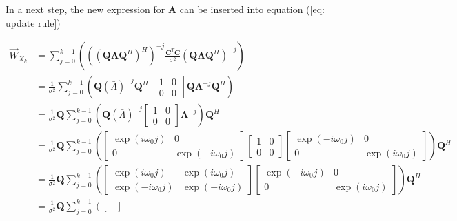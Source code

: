 \documentclass[11pt,a4paper,twoside]{report}
\newcommand{\messF}[3]{\overrightarrow{#1}_{{#2}_{k{#3}}}}
\newcommand{\mat}[1]{\mathbf{#1}}
\begin{document}
In a next step, the new expression for $\mat{A}$ can be inserted into equation (\ref{eq: update rule}) \cite{ST:Malmberg}

\begin{align}
	\nonumber
	\messF{W}{X}{} &= \sum_{j=0}^{k-1}\left(\left(\left(\mat{Q\Lambda}\mat{Q}^H\right)^H\right)^{-j}\frac{\mat{C}^T\mat{C}}{\sigma^2}\left(\mat{Q\Lambda}\mat{Q}^H\right)^{-j}\right) \\
	\label{eq: update rule, unitary Q}
	&= \frac{1}{\sigma^2}\sum_{j=0}^{k-1}\left(\mat{Q}\left(\bar{\Lambda}\right)^{-j}\mat{Q}^H
		\begin{bmatrix}
			1 & 0 \\
			0 & 0
		\end{bmatrix}
		\mat{Q}\mat{\Lambda}^{-j}\mat{Q}^H\right)
	\\
	\nonumber
	&= \frac{1}{\sigma^2}\mat{Q}\sum_{j=0}^{k-1}\left(\mat{Q}\left(\bar{\Lambda}\right)^{-j}
		\begin{bmatrix}
			1 & 0 \\
			0 & 0
		\end{bmatrix}
		\mat{\Lambda}^{-j}\right)\mat{Q}^H
	\\
	\nonumber
	&= \frac{1}{\sigma^2}\mat{Q}\sum_{j=0}^{k-1}\left(
		\begin{bmatrix}
			\exp{(i\omega_0j)} & 0 \\
			0 & \exp{(-i\omega_0j)}
		\end{bmatrix}
		\begin{bmatrix}
			1 & 0 \\
			0 & 0
		\end{bmatrix}
		\begin{bmatrix}
			\exp{(-i\omega_0j)} & 0 \\
			0 & \exp{(i\omega_0j)}
		\end{bmatrix}
		\right)\mat{Q}^H
	\\
	\nonumber
	&= \frac{1}{\sigma^2}\mat{Q}\sum_{j=0}^{k-1}\left(
		\begin{bmatrix}
			\exp{(i\omega_0j)} & \exp{(i\omega_0j)} \\
			\exp{(-i\omega_0j)} & \exp{(-i\omega_0j)}
		\end{bmatrix}
		\begin{bmatrix}
			\exp{(-i\omega_0j)} & 0 \\
			0 & \exp{(i\omega_0j)}
		\end{bmatrix}
		\right)\mat{Q}^H
	\\
	\nonumber
	&= \frac{1}{\sigma^2}\mat{Q}\sum_{j=0}^{k-1}\left(
		\begin{bmatrix}

\end{bmatrix}
\end{align}
\end{document}
